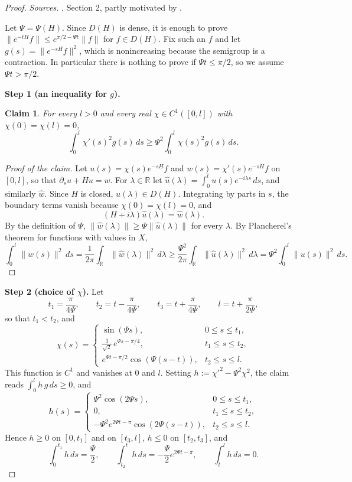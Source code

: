 \documentclass[11pt]{article}
\newtheorem*{claim}{Claim}
\theoremstyle{definition}
\theoremstyle{remark}
\begin{document}
\begin{proof}\label{proof-gearhart-pruss-wei}
\emph{Sources.} \citet{Wei2021Resolvent}, Section 2, partly motivated by \citet{HelfferSjostrand2010}.

Let $\Psi=\Psi(H)$. Since $D(H)$ is dense, it is enough to prove $\|e^{-tH}f\|\leq e^{\pi/2-\Psi t}\|f\|$ for $f\in D(H)$. Fix such an $f$ and let $g(s)=\|e^{-sH}f\|^2$, which is nonincreasing because the semigroup is a contraction. In particular there is nothing to prove if $\Psi t\leq\pi/2$, so we assume $\Psi t>\pi/2$.

\textbf{Step 1 (an inequality for $g$).}
\begin{claim}\label{clm-gearhart-pruss-wei}
For every $l>0$ and every real $\chi\in C^1([0,l])$ with $\chi(0)=\chi(l)=0$,
\[\int_0^l\chi'(s)^2g(s)\,ds\geq\Psi^2\int_0^l\chi(s)^2g(s)\,ds.\]
\end{claim}
\begin{proof}[Proof of the claim]\label{proof-clm-gearhart-pruss-wei}
Let $u(s)=\chi(s)e^{-sH}f$ and $w(s)=\chi'(s)e^{-sH}f$ on $[0,l]$, so that $\partial_su+Hu=w$. For $\lambda\in\mathbb{R}$ let $\hat u(\lambda)=\int_0^lu(s)e^{-i\lambda s}\,ds$, and similarly $\hat w$. Since $H$ is closed, $\hat u(\lambda)\in D(H)$. Integrating by parts in $s$, the boundary terms vanish because $\chi(0)=\chi(l)=0$, and
\[(H+i\lambda)\hat u(\lambda)=\hat w(\lambda).\]
By the definition of $\Psi$, $\|\hat w(\lambda)\|\geq\Psi\|\hat u(\lambda)\|$ for every $\lambda$. By Plancherel's theorem for functions with values in $X$,
\[\int_0^l\|w(s)\|^2\,ds=\frac{1}{2\pi}\int_{\mathbb{R}}\|\hat w(\lambda)\|^2\,d\lambda\geq\frac{\Psi^2}{2\pi}\int_{\mathbb{R}}\|\hat u(\lambda)\|^2\,d\lambda=\Psi^2\int_0^l\|u(s)\|^2\,ds.\]
\end{proof}

\textbf{Step 2 (choice of $\chi$).} Let
\[t_1=\frac{\pi}{4\Psi},\qquad t_2=t-\frac{\pi}{4\Psi},\qquad t_3=t+\frac{\pi}{4\Psi},\qquad l=t+\frac{\pi}{2\Psi},\]
so that $t_1<t_2$, and
\[\chi(s)=\begin{cases}\sin(\Psi s),&0\leq s\leq t_1,\\ \frac{1}{\sqrt2}\,e^{\Psi s-\pi/4},&t_1\leq s\leq t_2,\\ e^{\Psi t-\pi/2}\cos(\Psi(s-t)),&t_2\leq s\leq l.\end{cases}\]
This function is $C^1$ and vanishes at $0$ and $l$. Setting $h:=\chi'^2-\Psi^2\chi^2$, the claim reads $\int_0^lh\,g\,ds\geq0$, and
\[h(s)=\begin{cases}\Psi^2\cos(2\Psi s),&0\leq s\leq t_1,\\ 0,&t_1\leq s\leq t_2,\\ -\Psi^2e^{2\Psi t-\pi}\cos(2\Psi(s-t)),&t_2\leq s\leq l.\end{cases}\]
Hence $h\geq0$ on $[0,t_1]$ and on $[t_3,l]$, $h\leq0$ on $[t_2,t_3]$, and
\[\int_0^{t_1}h\,ds=\frac{\Psi}{2},\qquad\int_{t_2}^{t}h\,ds=-\frac{\Psi}{2}e^{2\Psi t-\pi},\qquad\int_t^lh\,ds=0.\]


\end{proof}
\end{document}
